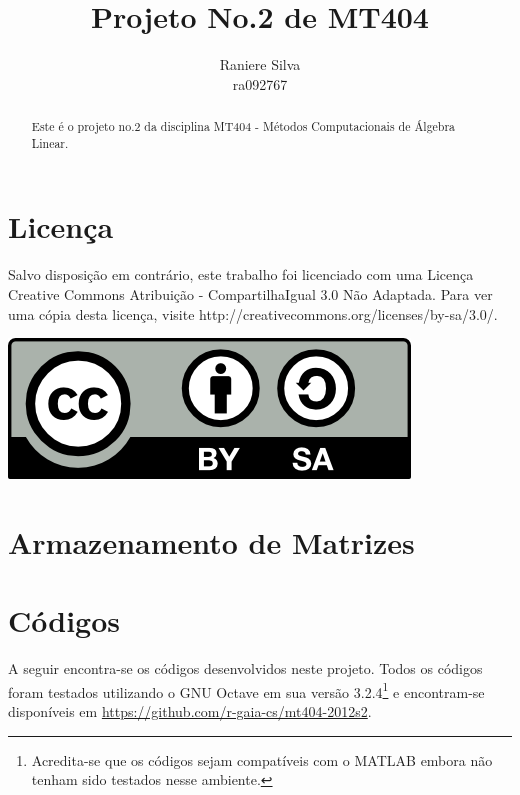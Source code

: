\documentclass[12pt,a4paper]{article}
\begin{document}
\title{Projeto No.2 de MT404}
\author{Raniere Silva \\ ra092767}
\maketitle
\begin{abstract}
    Este \'{e} o projeto no.2 da disciplina MT404 - M\'{e}todos Computacionais de \'{A}lgebra Linear.
\end{abstract}
\tableofcontents
\lstlistoflistings
\section*{Licen\c{c}a}
Salvo disposi\c{c}\~{a}o em contr\'{a}rio, este trabalho foi licenciado com uma Licen\c{c}a Creative Commons Atribui\c{c}\~{a}o - CompartilhaIgual 3.0 N\~{a}o Adaptada. Para ver uma c\'{o}pia desta licen\c{c}a, visite http://creativecommons.org/licenses/by-sa/3.0/.
\begin{center}
    \includegraphics{../figuras/cc-by-sa.png}
\end{center}
\newpage
\section{Armazenamento de Matrizes}

\section{C\'{o}digos}
A seguir encontra-se os códigos desenvolvidos neste projeto. Todos os códigos foram testados utilizando o GNU Octave em sua versão 3.2.4\footnote{Acredita-se que os códigos sejam compatíveis com o MATLAB embora não tenham sido testados nesse ambiente.} e encontram-se disponíveis em \url{https://github.com/r-gaia-cs/mt404-2012s2}.
%
\end{document}
